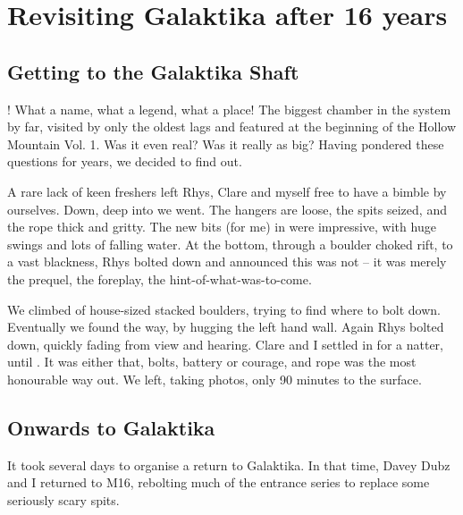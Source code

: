 \section{Revisiting Galaktika after 16 years}

    
\subsection{Getting to the Galaktika Shaft}

! What a name, what a legend, what a place! The biggest chamber in the system by far, visited by only the oldest lags and featured at the beginning of the Hollow Mountain Vol. 1. Was it even real? Was it really as big? Having pondered these questions for years, we decided to find out.

A rare lack of keen freshers left Rhys, Clare and myself free to have a bimble by ourselves. Down, deep into  we went. The hangers are loose, the spits seized, and the rope thick and gritty.
The new bits (for me) in  were impressive, with huge swings and lots of falling water. At the bottom, through a boulder choked rift, to a vast blackness, Rhys bolted down and announced this was not  – it was merely the prequel, the foreplay, the hint-of-what-was-to-come.

We climbed of house-sized stacked boulders, trying to find where to bolt down. Eventually we found the way, by hugging the left hand wall. Again Rhys bolted down, quickly fading from view and hearing. Clare and I settled in for a natter, until .  It was either that, bolts, battery or courage, and rope was the most honourable way out. We left, taking photos, only 90 minutes to the surface.

\subsection{Onwards to Galaktika}

It took several days to organise a return to Galaktika. In that time, Davey Dubz and I returned to M16, rebolting much of the entrance series to replace some seriously scary spits. 


